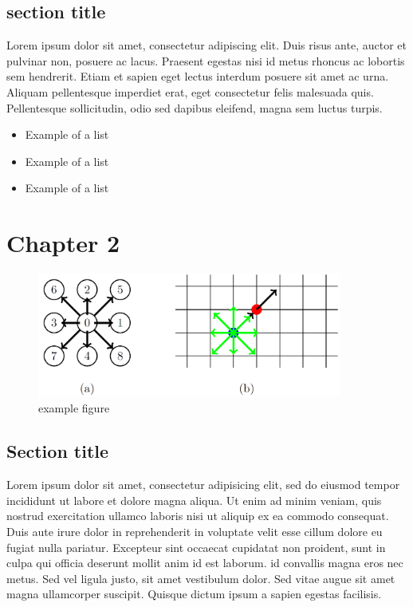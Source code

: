 \documentclass[a4paper,11pt]{report}
\begin{document}
\section{section title}
Lorem ipsum dolor sit amet, consectetur adipiscing elit. Duis risus ante, auctor et pulvinar non, posuere ac lacus. Praesent egestas nisi id metus rhoncus ac lobortis sem hendrerit. Etiam et sapien eget lectus interdum posuere sit amet ac urna. Aliquam pellentesque imperdiet erat, eget consectetur felis malesuada quis. Pellentesque sollicitudin, odio sed dapibus eleifend, magna sem luctus turpis.

\begin{itemize}
  \item Example of a list
  \item Example of a list
  \item Example of a list
\end{itemize}

\chapter{Chapter 2}

\begin{figure}[h!]
  \begin{center}
   \includegraphics[width=10cm]{logos/Gitter_LBM.png}
   \caption{example figure}
  \label{fig:mesh}
  \end{center}
\end{figure}

\section{Section title}
Lorem ipsum dolor sit amet, consectetur adipisicing elit, sed do eiusmod tempor incididunt ut labore et dolore magna aliqua. Ut enim ad minim veniam, quis nostrud exercitation ullamco laboris nisi ut aliquip ex ea commodo consequat. \\ Duis aute irure dolor in reprehenderit in voluptate velit esse cillum dolore eu fugiat nulla pariatur. Excepteur sint occaecat cupidatat non proident, sunt in culpa qui officia deserunt mollit anim id est laborum.
id convallis magna eros nec metus. Sed vel ligula justo, sit amet vestibulum dolor. Sed vitae augue sit amet magna ullamcorper suscipit. Quisque dictum ipsum a sapien egestas facilisis.
\end{document}
